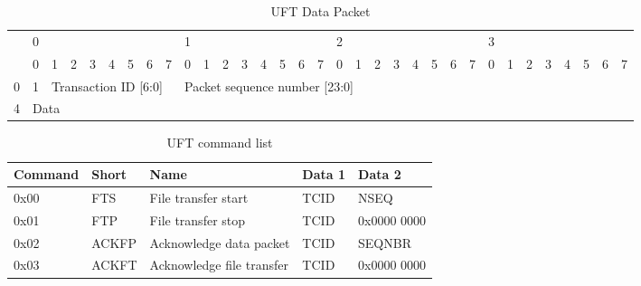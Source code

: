 \begin{table}[]
\centering
\begin{adjustbox}{max width=\textwidth}
\begin{tabular}{l|llllllll|llllllll|llllllll|llllllll}
 & 0 &  &  &  &  &  &  &  & 1 &  &  &  &  &  &  &  & 2 &  &  &  &  &  &  &  & 3 &  &  &  &  &  &  &  \\
 & \multicolumn{1}{l|}{0} & \multicolumn{1}{l|}{1} & \multicolumn{1}{l|}{2} & \multicolumn{1}{l|}{3} & \multicolumn{1}{l|}{4} & \multicolumn{1}{l|}{5} & \multicolumn{1}{l|}{6} & 7 & \multicolumn{1}{l|}{0} & \multicolumn{1}{l|}{1} & \multicolumn{1}{l|}{2} & \multicolumn{1}{l|}{3} & \multicolumn{1}{l|}{4} & \multicolumn{1}{l|}{5} & \multicolumn{1}{l|}{6} & 7 & \multicolumn{1}{l|}{0} & \multicolumn{1}{l|}{1} & \multicolumn{1}{l|}{2} & \multicolumn{1}{l|}{3} & \multicolumn{1}{l|}{4} & \multicolumn{1}{l|}{5} & \multicolumn{1}{l|}{6} & 7 & \multicolumn{1}{l|}{0} & \multicolumn{1}{l|}{1} & \multicolumn{1}{l|}{2} & \multicolumn{1}{l|}{3} & \multicolumn{1}{l|}{4} & \multicolumn{1}{l|}{5} & \multicolumn{1}{l|}{6} & 7 \\ \hline
0 & \multicolumn{1}{l|}{1} & \multicolumn{7}{l|}{Transaction ID {[}6:0{]}} & \multicolumn{24}{l|}{Packet sequence number {[}23:0{]}} \\ \hline
4 & \multicolumn{32}{l|}{Data} \\ \hline
\end{tabular}
\end{adjustbox}
\caption{UFT Data Packet}
\label{tab:uftdata}
\end{table}


\begin{table}[b!]
    \centering
    \begin{tabular}{l l l l l}
        \toprule
        Command & Short & Name & Data 1 & Data 2 \\
        \midrule
        0x00 & FTS & 
        File transfer start & TCID & NSEQ
        \\
        0x01 & FTP &
        File transfer stop & TCID & 0x0000 0000
        \\
        0x02 & ACKFP &
        Acknowledge data packet & TCID & SEQNBR
        \\
        0x03 & ACKFT &
        Acknowledge file transfer & TCID & 0x0000 0000
        \\
        \bottomrule
    \end{tabular}
    \caption{UFT command list}
    \label{tab:uftcommandlist}
\end{table}

